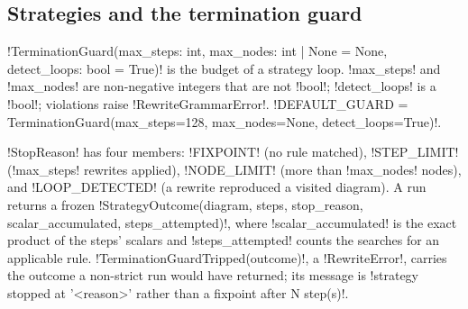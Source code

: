\subsection{Strategies and the termination guard}

\begin{definition}\label{def:rewriting-guardrec}
\py!TerminationGuard(max_steps: int, max_nodes: int | None = None, detect_loops: bool = True)! is
the budget of a strategy loop. \py!max_steps! and \py!max_nodes! are non-negative integers that are
not \py!bool!; \py!detect_loops! is a \py!bool!; violations raise \py!RewriteGrammarError!.
\py!DEFAULT_GUARD = TerminationGuard(max_steps=128, max_nodes=None, detect_loops=True)!.
\end{definition}

\py!StopReason! has four members: \code!FIXPOINT! (no rule matched), \code!STEP_LIMIT!
(\py!max_steps! rewrites applied), \code!NODE_LIMIT! (more than \py!max_nodes! nodes), and
\code!LOOP_DETECTED! (a rewrite reproduced a visited diagram). A run returns a frozen
\py!StrategyOutcome(diagram, steps, stop_reason, scalar_accumulated, steps_attempted)!, where
\py!scalar_accumulated! is the exact product of the steps' scalars and \py!steps_attempted! counts
the searches for an applicable rule. \py!TerminationGuardTripped(outcome)!, a \py!RewriteError!,
carries the outcome a non-strict run would have returned; its message is
\code!strategy stopped at '<reason>' rather than a fixpoint after N step(s)!.


